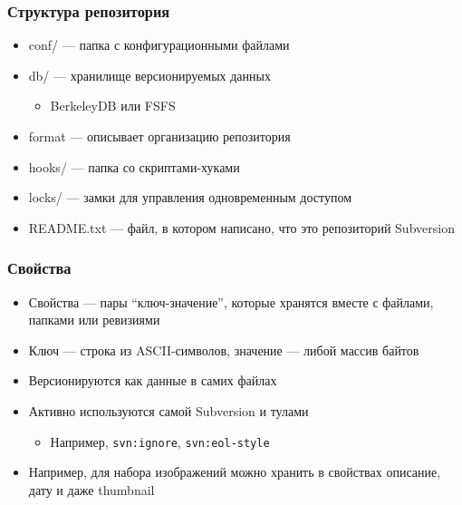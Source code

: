 \documentclass[xetex,mathserif,serif]{beamer}
\begin{document}
	\begin{frame}
		\frametitle{Структура репозитория}
		\begin{itemize}
			\item conf/ --- папка с конфигурационными файлами
			\item db/ --- хранилище версионируемых данных
			\begin{itemize}
				\item BerkeleyDB или FSFS
			\end{itemize}
			\item format --- описывает организацию репозитория
			\item hooks/ --- папка со скриптами-хуками
			\item locks/ --- замки для управления одновременным доступом
			\item README.txt --- файл, в котором написано, что это репозиторий Subversion
		\end{itemize}
	\end{frame}

	\begin{frame}[fragile]
		\frametitle{Свойства}
		\begin{itemize}
			\item Свойства --- пары ``ключ-значение'', которые хранятся вместе с файлами, папками или ревизиями
			\item Ключ --- строка из ASCII-символов, значение --- либой массив байтов
			\item Версионируются как данные в самих файлах
			\item Активно используются самой Subversion и тулами
			\begin{itemize}
				\item Например, \verb|svn:ignore|, \verb|svn:eol-style|
			\end{itemize}
			\item Например, для набора изображений можно хранить в свойствах описание, дату и даже thumbnail
		\end{itemize}
	\end{frame}
\end{document}
